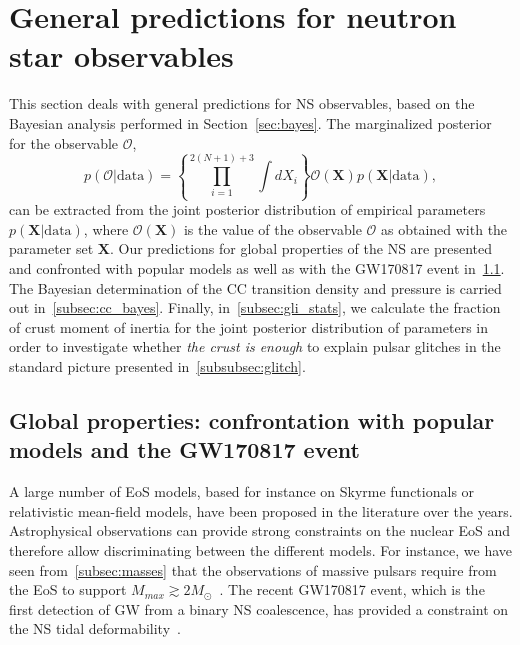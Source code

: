 \section{General predictions for neutron star observables}\label{sec:general}

This section deals with general predictions for NS observables, based on the
Bayesian analysis performed in Section~\ref{sec:bayes}. The marginalized
posterior for the observable $\mathcal{O}$,
%
\begin{equation}
  p(\mathcal{O}|\text{data}) = \left\{\prod_{i=1}^{2(N+1)+3}\int
  dX_i\right\}\mathcal{O}(\bm{X})p(\bm{X}|\text{data}),\label{eq:margobs}
\end{equation}
%
can be extracted from the joint posterior distribution of empirical parameters
$p(\bm{X}|\text{data})$, where $\mathcal{O}(\bm{X})$ is the value of the
observable $\mathcal{O}$ as obtained with the parameter set $\bm{X}$.
Our predictions for global properties of the NS are presented and confronted 
with popular models as well as with the GW170817 event in~\ref{subsec:gw17}. 
The Bayesian determination of the CC transition density and pressure is carried 
out in~\ref{subsec:cc_bayes}.
Finally, in~\ref{subsec:gli_stats}, we calculate the fraction of crust moment
of inertia for the joint posterior distribution of parameters in order to 
investigate whether \textit{the crust is enough} to explain pulsar glitches in 
the standard picture presented in~\ref{subsubsec:glitch}. 

\subsection{Global properties: confrontation with popular models and the 
GW170817 event}\label{subsec:gw17}

A large number of EoS models, based for instance on Skyrme functionals or 
relativistic mean-field models, have been proposed in the literature over the 
years. Astrophysical observations can provide strong constraints on the
nuclear EoS  and therefore allow discriminating between the different models. 
For instance, we have seen from~\ref{subsec:masses} that the observations of 
massive pulsars require from the EoS to support $M_{max} \gtrsim
2M_\odot$~\cite{Demorest2010,Antoniadis2013,Cromartie2020}.
The recent GW170817 event, which is the first detection of GW from a 
binary NS coalescence, has provided a constraint on the NS tidal 
deformability~\cite{GWtidal,GW1,GW2}.

